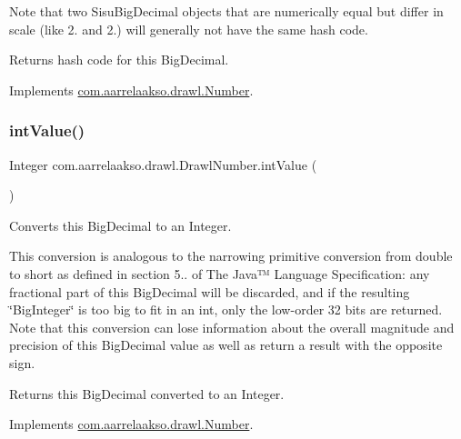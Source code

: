 Note that two Sisu\+Big\+Decimal objects that are numerically equal but differ in scale (like 2. and 2.) will generally not have the same hash code.

\begin{DoxyReturn}{Returns}
hash code for this Big\+Decimal. 
\end{DoxyReturn}


Implements \hyperlink{interfacecom_1_1aarrelaakso_1_1drawl_1_1_number_a493e402b6856cded24d43022bd1b816a}{com.\+aarrelaakso.\+drawl.\+Number}.

\mbox{\label{classcom_1_1aarrelaakso_1_1drawl_1_1_drawl_number_a8022d04415c5449344ac1e23658f8802}} 
\subsubsection{\texorpdfstring{int\+Value()}{intValue()}}
{\footnotesize\ttfamily Integer com.\+aarrelaakso.\+drawl.\+Drawl\+Number.\+int\+Value (\begin{DoxyParamCaption}{ }\end{DoxyParamCaption})}



Converts this Big\+Decimal to an Integer. 

This conversion is analogous to the narrowing primitive conversion from double to short as defined in section 5.. of The Java™ Language Specification\+: any fractional part of this Big\+Decimal will be discarded, and if the resulting \char`\"{}\+Big\+Integer\char`\"{} is too big to fit in an int, only the low-\/order 32 bits are returned. Note that this conversion can lose information about the overall magnitude and precision of this Big\+Decimal value as well as return a result with the opposite sign.

\begin{DoxyReturn}{Returns}
this Big\+Decimal converted to an Integer. 
\end{DoxyReturn}


Implements \hyperlink{interfacecom_1_1aarrelaakso_1_1drawl_1_1_number_a82bd01108e6f99cba2e83759fa363f39}{com.\+aarrelaakso.\+drawl.\+Number}.

\mbox{\label{classcom_1_1aarrelaakso_1_1drawl_1_1_drawl_number_af9c62a136858a5eae279039658a2cfdc}} 
